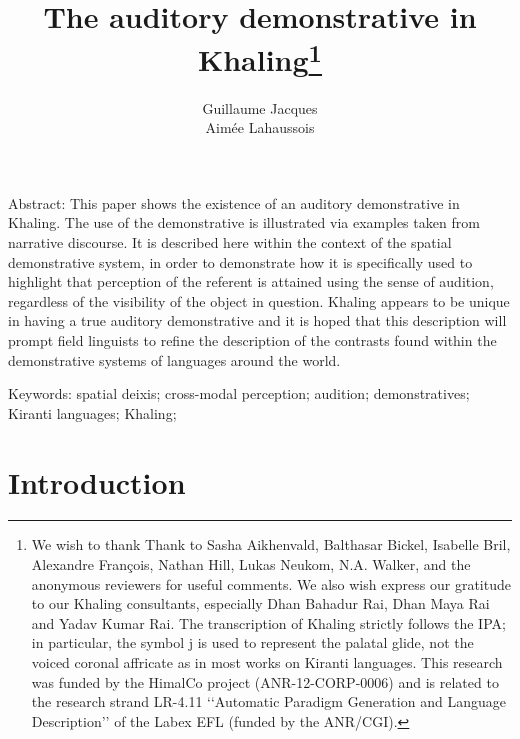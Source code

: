 \documentclass[oldfontcommands,oneside,a4paper,11pt]{article}
\newcommand{\ipa}[1]{{\phon \mbox{#1}}} %
\begin{document}
 
\linenumbers

\title{The auditory demonstrative  in Khaling\footnote{We wish to thank Thank to  
Sasha Aikhenvald, Balthasar Bickel, Isabelle Bril, Alexandre François, Nathan Hill,  Lukas Neukom, N.A. Walker, and the anonymous reviewers for useful comments. We also wish express our gratitude to our Khaling consultants, especially Dhan Bahadur Rai, Dhan Maya Rai and Yadav Kumar Rai. The transcription of Khaling   strictly follows the IPA; in particular, the symbol \ipa{j} is used to represent the palatal glide, not the voiced coronal affricate as in most works on Kiranti languages. This research was funded by the HimalCo project (ANR-12-CORP-0006) and is related to the research strand LR-4.11 ‘‘Automatic Paradigm Generation and Language Description’’ of the Labex EFL (funded by the ANR/CGI). } } 
\author{Guillaume Jacques \\ Aimée Lahaussois}
\maketitle

Abstract: This paper shows the existence of an auditory demonstrative in Khaling.  The use of the demonstrative is illustrated via examples taken from narrative discourse.  It  is described here within the context of the spatial demonstrative system, in order to demonstrate how it is specifically used to  highlight that perception of the referent is attained using the sense of audition, regardless of the visibility of the object in question.  Khaling appears to be unique in having a true auditory demonstrative and it is hoped that this description will prompt field linguists to refine the description of the contrasts found within the demonstrative systems of languages around the world.


Keywords:   spatial deixis; cross-modal perception; audition; demonstratives; Kiranti languages; Khaling; 


\section{Introduction}
 
\end{document}
